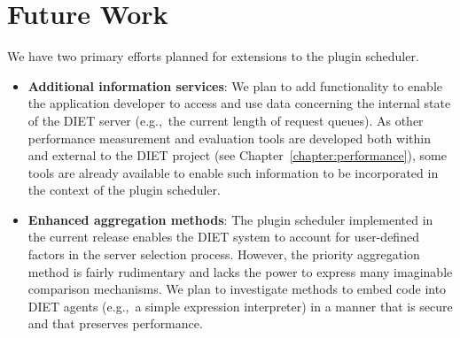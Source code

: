 %
%


\section{Future Work}

We have two primary efforts planned for extensions to the plugin
scheduler.
\begin{itemize}
\item \textbf{Additional information services}: We plan to add
  functionality to enable the application developer to access and use
  data concerning the internal state of the DIET server (e.g.,~the
  current length of request queues).  As other performance measurement
  and evaluation tools are developed both within and external to the
  DIET project (see Chapter~\ref{chapter:performance}), some
  tools are already available to enable such 
  information to be incorporated
  in the context of the plugin scheduler.
\item \textbf{Enhanced aggregation methods}: The plugin scheduler
  implemented in the current release enables the DIET system to
  account for user-defined factors in the server selection process.
  However, the priority aggregation method is fairly rudimentary and
  lacks the power to express many imaginable comparison mechanisms.
  We plan to investigate methods to embed code into DIET agents
  (e.g.,~a simple expression interpreter) in a manner that is secure
  and that preserves performance.
\end{itemize}


